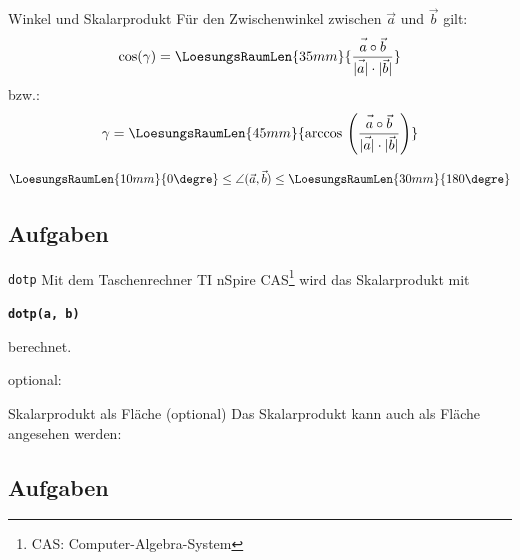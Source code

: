 \begin{gesetz}{Winkel und Skalarprodukt}{}
Für den Zwischenwinkel zwischen $\vec{a}$ und $\vec{b}$ gilt:
  $$\cos(\gamma) = \LoesungsRaumLen{35mm}{\frac{\vec{a\vphantom{b}}\circ\vec{b}}{|\vec{\vphantom{b}a}|\cdot |\vec{\vphantom{b}b}|}}$$
  bzw.:
  $$\gamma = \LoesungsRaumLen{45mm}{\arccos{} \left(\frac{\vec{a\vphantom{b}}\circ\vec{b}}{|\vec{\vphantom{b}a}|\cdot |\vec{\vphantom{b}b}|}\right)}$$

  $$\LoesungsRaumLen{10mm}{0\degre} \le \angle (\vec{a}, \vec{b}) \le \LoesungsRaumLen{30mm}{180\degre}$$
\end{gesetz}


\subsection*{Aufgaben}


\newpage


\begin{bemerkung}{\texttt{dotp}}{}
Mit dem Taschenrechner TI nSpire CAS\footnote{CAS: Computer-Algebra-System} wird das Skalarprodukt mit

\begin{center}\textbf\texttt{dotp(a, b)}\end{center}

berechnet.

\end{bemerkung}

optional:

\begin{bemerkung}{Skalarprodukt als Fläche (optional)}{}
  Das Skalarprodukt kann auch als Fläche angesehen werden:
  
\end{bemerkung}



\subsection*{Aufgaben}


